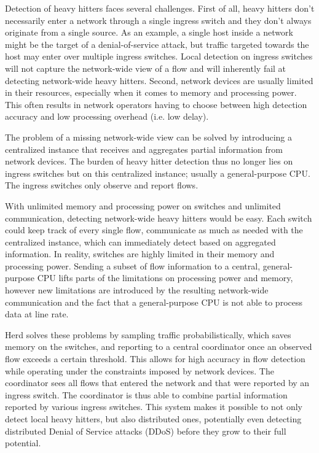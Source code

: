 \documentclass[11pt,oneside,a4paper]{article}
\begin{document}
Detection of heavy hitters faces several challenges. First of all, heavy hitters don't necessarily enter a network through a single ingress switch and they don't always originate from a single source. As an example, a single host inside a network might be the target of a denial-of-service attack, but traffic targeted towards the host may enter over multiple ingress switches. Local detection on ingress switches will not capture the network-wide view of a flow and will inherently fail at detecting network-wide heavy hitters. Second, network devices are usually limited in their resources, especially when it comes to memory and processing power. This often results in network operators having to choose between high detection accuracy and low processing overhead (i.e. low delay).

\noindent The problem of a missing network-wide view can be solved by introducing a centralized instance that receives and aggregates partial information from network devices. The burden of heavy hitter detection thus no longer lies on ingress switches but on this centralized instance; usually a general-purpose CPU. The ingress switches only observe and report flows.

\noindent With unlimited memory and processing power on switches and unlimited communication, detecting network-wide heavy hitters would be easy. Each switch could keep track of every single flow, communicate as much as needed with the centralized instance, which can immediately detect based on aggregated information. In reality, switches are highly limited in their memory and processing power. Sending a subset of flow information to a central, general-purpose CPU lifts parts of the limitations on processing power and memory, however new limitations are introduced by the resulting network-wide communication and the fact that a general-purpose CPU is not able to process data at line rate.

Herd \cite{anon2019herd} solves these problems by sampling traffic probabilistically, which saves memory on the switches, and reporting to a central coordinator once an observed flow exceeds a certain threshold. This allows for high accuracy in flow detection while operating under the constraints imposed by network devices. The coordinator sees all flows that entered the network and that were reported by an ingress switch. The coordinator is thus able to combine partial information reported by various ingress switches. This system makes it possible to not only detect local heavy hitters, but also distributed ones, potentially even detecting distributed Denial of Service attacks (DDoS) before they grow to their full potential.
\end{document}
